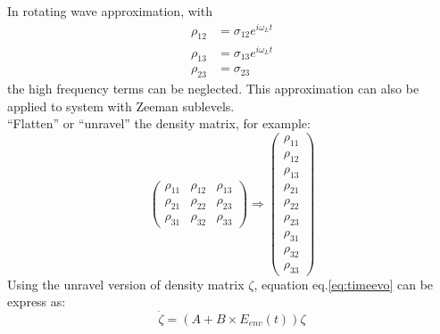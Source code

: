 \documentclass[11pt,a4paper]{article}
\begin{document}
In rotating wave approximation, with
\begin{align*}
  \rho_{12} &= \sigma_{12}e^{i\omega_L t}\\
  \rho_{13} &= \sigma_{13}e^{i\omega_L t}\\
  \rho_{23} &= \sigma_{23}
\end{align*}
the high frequency terms can be neglected. This approximation can also be applied to system with Zeeman sublevels.\\

``Flatten'' or ``unravel'' the density matrix, for example:
\[
\left( 
\begin{array}{ccc}
  \rho_{11}&\rho_{12}&\rho_{13}\\
  \rho_{21}&\rho_{22}&\rho_{23}\\
  \rho_{31}&\rho_{32}&\rho_{33}
\end{array}
\right)
\Rightarrow
\left( 
\begin{array}{c}
  \rho_{11}\\\rho_{12}\\\rho_{13}\\
  \rho_{21}\\\rho_{22}\\\rho_{23}\\
  \rho_{31}\\\rho_{32}\\\rho_{33}
\end{array}
\right)
\]
Using the unravel version of density matrix $\zeta$, equation eq.\ref{eq:timeevo} can be express as:
\begin{equation}
  \label{eq:motion}
  \dot{\zeta} = (A+B\times E_{env} (t))\zeta  
\end{equation}
\end{document}
